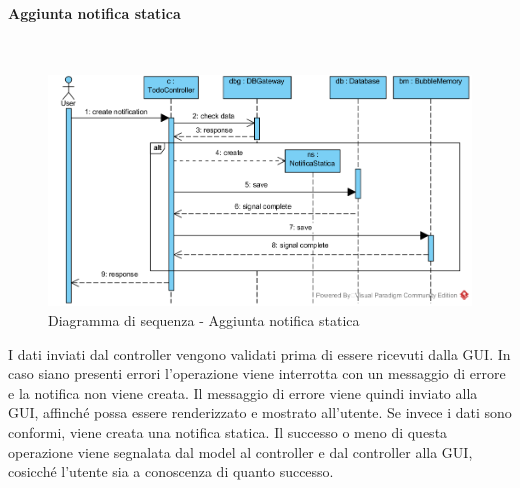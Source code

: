 \begin{samepage}
	\paragraph{Aggiunta notifica statica}\mbox{}\\
\end{samepage}
\begin{figure}[H]
	\centering
	\includegraphics[width=14cm]{../../documenti/SpecificaTecnica/diagrammi_img/sequenza/todo_aggiungi_notifica.png}
	\caption{Diagramma di sequenza - Aggiunta notifica statica}
\end{figure}
I dati inviati dal controller vengono validati prima di essere ricevuti dalla GUI. In caso siano presenti errori l'operazione viene interrotta con un messaggio di errore e la notifica non viene creata. Il messaggio di errore viene quindi inviato alla GUI, affinché possa essere renderizzato e mostrato all'utente. Se invece i dati sono conformi, viene creata una notifica statica. Il successo o meno di questa operazione viene segnalata dal model al controller e dal controller alla GUI, cosicché l'utente sia a conoscenza di quanto successo.

